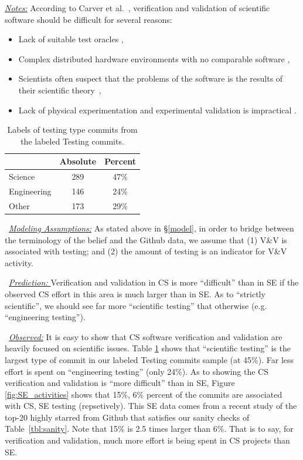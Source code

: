 \documentclass[sigconf,review,anonymous]{acmart}
\newcommand{\bi}{\begin{itemize}}
\newcommand{\ei}{\end{itemize}}
\begin{document}
\noindent \textit{\underline{Notes:}} 
According to Carver et al.~\cite{carver07_environment},
verification and validation of scientific software should be difficult for several reasons:
\bi
  \item Lack of suitable test oracles \cite{kanewala13_testing},
  \item Complex distributed hardware environments with no comparable software \cite{basili08_hpc},
  \item Scientists often suspect that the problems of the software is the results of their scientific theory~\cite{faulk09_secs},
  \item Lack of physical experimentation and experimental validation is impractical \cite{carver07_environment}. 
\ei


\begin{table}
\caption{Labels of testing type commits from the labeled Testing commits.}\label{tbl:testing}
\footnotesize \begin{tabular}{l|c|c}
\multicolumn{1}{c|}{} & \multicolumn{1}{c|}{Absolute} & \multicolumn{1}{c}{Percent}\\
\hline
Science & 289 & 47\% \\
Engineering & 146 & 24\% \\
Other & 173 & 29\% 
\end{tabular}
\end{table}\noindent~\textit{\underline{Modeling Assumptions:}} 
As stated above in \S\ref{model},
in order to bridge between the terminology of the belief and the Github data, we assume that (1) V\&V is associated with testing; and (2) the amount of testing is an indicator for V\&V activity.

\noindent ~\textit{\underline{Prediction: }}
Verification and validation in CS is more
``difficult'' than in SE if the observed CS effort in this area
is much larger than in SE. As to ``strictly scientific'', we should see far more ``scientific
testing'' that otherwise (e.g. ``engineering testing''). 




\noindent ~\textit{\underline{Observed:}}
It is easy to show that CS software verification and validation are heavily focused on scientific issues.
Table \ref{tbl:testing} shows that ``scientific testing'' is the largest type of commit in our labeled Testing commits sample (at 45\%). 
Far less effort is spent on ``engineering testing'' (only 24\%). 
As to showing the CS verification and validation is ``more difficult'' than in SE,
  Figure \ref{fig:SE_activities} shows that
  15\%, 6\% percent of the commits
  are associated with CS, SE testing (repsetively).   This SE data comes from a recent study \cite{tu2019better} of the top-20 highly starred from Github that satisfies our sanity checks of Table~\ref{tbl:sanity}.
Note that  15\% is 2.5 times larger than 6\%. That is
to say, for  verification and validation, 
much more effort is being spent in CS projects than SE.
\end{document}
